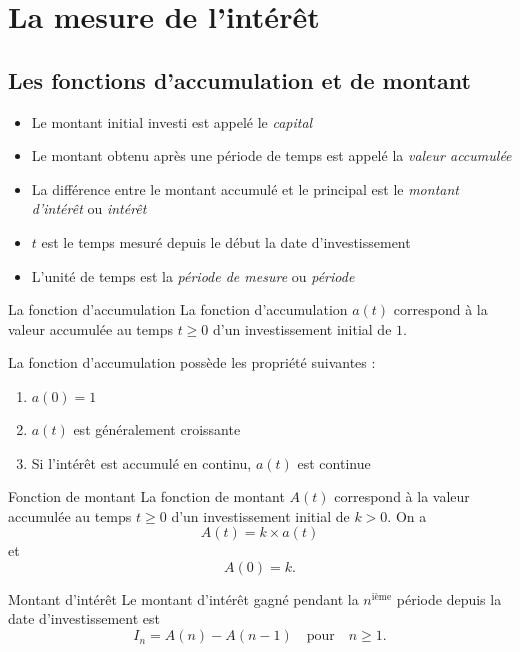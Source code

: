 \chapter{La mesure de l'intérêt}

\section{Les fonctions d'accumulation et de montant}

\begin{itemize}
	\item Le montant initial investi est appelé le \textit{capital}
	\item Le montant obtenu après une période de temps est appelé la \textit{valeur accumulée}
	\item La différence entre le montant accumulé et le principal est le \textit{montant d'intérêt} ou \textit{intérêt}
	\item $t$ est le temps mesuré depuis le début la date d'investissement
	\item L'unité de temps est la \textit{période de mesure} ou \textit{période}
\end{itemize}

\begin{definition}{La fonction d'accumulation}{}
	La fonction d'accumulation $a(t)$ correspond à la valeur accumulée au temps $t\geq 0$ d'un investissement initial de $1$. 
\end{definition}

La fonction d'accumulation possède les propriété suivantes : 
\begin{enumerate}
	\item $a(0) = 1$
	\item $a(t)$ est généralement croissante
	\item Si l'intérêt est accumulé en continu, $a(t)$ est continue
\end{enumerate}

\begin{definition}{Fonction de montant}{}
	La fonction de montant $A(t)$ correspond à la valeur accumulée au temps $t\geq 0$ d'un investissement initial de $k>0$. On a 
	$$A(t) = k \times a(t)$$
	et
	$$A(0) = k.$$
\end{definition}

\begin{definition}{Montant d'intérêt}{}
	Le montant d'intérêt gagné pendant la $n^{\text{ième}}$ période depuis la date d'investissement est $$I_n = A(n) - A(n-1) \quad \text{pour} \quad n\geq 1.$$
\end{definition}

